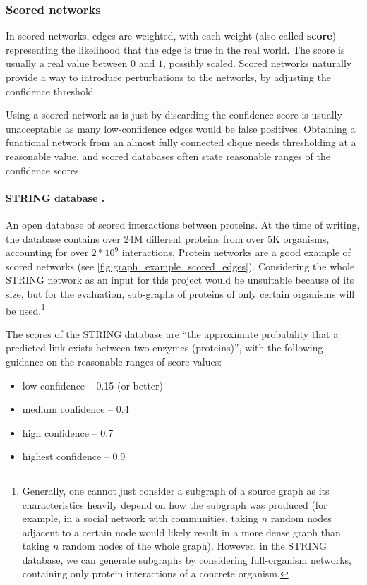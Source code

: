 \subsubsection*{Scored networks}\label{sec:scored_networks}

In scored networks, edges are weighted, with each weight (also called \textbf{score}) representing the likelihood that the edge is true in the real world.
The score is usually a real value between $0$ and $1$, possibly scaled.
Scored networks naturally provide a way to introduce perturbations to the networks, by adjusting the confidence threshold.

Using a scored network as-is just by discarding the confidence score is usually unacceptable as many low-confidence edges would be false positives.
Obtaining a functional network from an almost fully connected clique needs thresholding at a reasonable value, and scored databases often state reasonable ranges of the confidence scores.

\paragraph*{STRING database {\normalfont\cite{Szklarczyk2019}}.} An open database of scored interactions between proteins.
At the time of writing, the database contains over 24M different proteins from over 5K organisms, accounting for over $2 * 10^9$ interactions.
Protein networks are a good example of scored networks (see \cref{fig:graph_example_scored_edges}).
Considering the whole STRING network as an input for this project would be unsuitable because of its size, but for the evaluation, sub-graphs of proteins of only certain organisms will be used.\footnote{Generally, one cannot just consider a subgraph of a source graph as its characteristics heavily depend on how the subgraph was produced (for example, in a social network with communities, taking $n$ random nodes adjacent to a certain node would likely result in a more dense graph than taking $n$ random nodes of the whole graph).
However, in the STRING database, we can generate subgraphs by considering full-organism networks, containing only protein interactions of a concrete organism.}



The scores of the STRING database are \enquote{the approximate probability that a predicted link exists between two enzymes (proteins)}, with the following guidance on the reasonable ranges of score values:
\begin{itemize}[topsep=5pt,itemsep=-4pt]
    \item low confidence -- 0.15 (or better)
    \item medium confidence -- 0.4
    \item high confidence -- 0.7
    \item highest confidence -- 0.9
\end{itemize}

